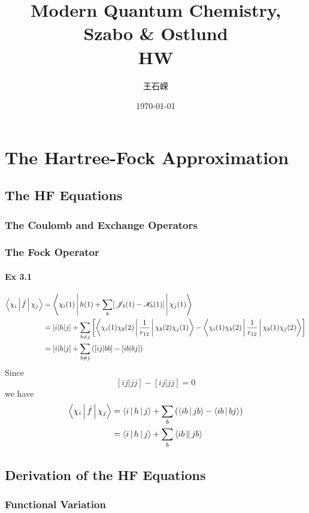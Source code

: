 \documentclass[a4paper]{article}
\title{\textbf{Modern Quantum Chemistry, Szabo \& Ostlund}\\HW}
\author{王石嵘
\vspace{5pt}\\
}
\date{\today} %
\newcommand{\ex}[1]{\paragraph{Ex #1}}
\numberwithin{equation}{subsection}
\begin{document}

\maketitle

\tableofcontents

\newpage

\setcounter{section}{2}
\section{The Hartree-Fock Approximation}
\subsection{The HF Equations}
\subsubsection{The Coulomb and Exchange Operators}
\subsubsection{The Fock Operator}
\ex{3.1}
\begin{align}
\Braket{\chi_i | \hat{f} | \chi_j} &= \Braket{ \chi_i(1) | h(1) + \sum_{b} [\mathscr{J}_b(1) - \mathscr{K}_b(1)] | \chi_j(1)} \notag\\
&= [i|h|j] + \sum_{b\neq j}\qty[\Braket{\chi_i(1) \chi_b(2) | \dfrac{1}{r_{12}} | \chi_b(2)\chi_j(1)} - \Braket{\chi_i(1)\chi_b(2) | \dfrac{1}{r_{12}} | \chi_b(1)\chi_j(2)}] \notag\\
&= [i|h|j] + \sum_{b\neq j}\qty([ij|bb] - [ib|bj]) 
\end{align}
Since
\begin{equation}\label{key}
[ij|jj] - [ij|jj] = 0
\end{equation}
we have
\begin{align}
\Braket{\chi_i | \hat{f} | \chi_j}
&= \Braket{i|h|j} + \sum_b\qty(\Braket{ib|jb} - \Braket{ib|bj}) \notag\\
&= \Braket{i|h|j} + \sum_b\Braket{ib||jb}
\end{align}

\subsection{Derivation of the HF Equations}
\subsubsection{Functional Variation}
\end{document}
